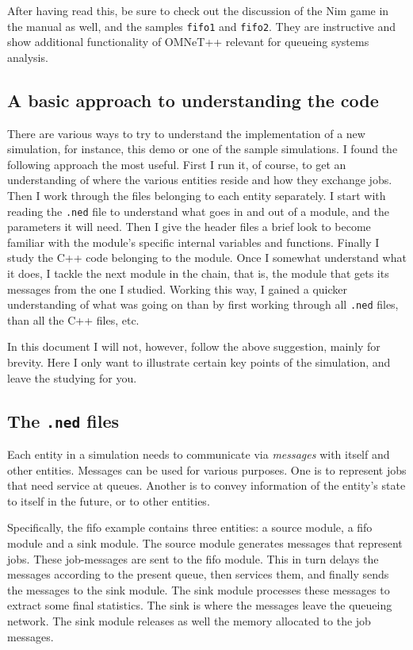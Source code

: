 \documentclass[a4paper]{article}
\begin{document}
After having read this, be sure to check out the discussion of the Nim
game in the manual as well, and the samples \texttt{fifo1} and
\texttt{fifo2}.  They are instructive and show additional
functionality of OMNeT++ relevant for queueing systems analysis.

\subsection{A basic  approach to understanding the code}
There are various ways to try to understand the implementation of a
new simulation, for instance, this demo or one of the sample
simulations. I found the following approach the most useful. First I
run it, of course, to get an understanding of where the various
entities reside and how they exchange jobs. Then I work through the
files belonging to  each
entity  separately. I start with reading the \texttt{.ned} file to
understand what goes in and out of a module, and the parameters it
will need.  Then I give the header files a brief look to become
familiar with the module's specific internal variables and functions.
Finally I study the C++ code belonging to the  module. Once I somewhat
understand what it  does, I tackle the next module in the
chain, that is, the module that gets its messages from the one  I
studied. Working this way, I gained a quicker understanding
of what was going on than by first working through all \texttt{.ned}
files, than all the C++ files, etc.

In this document I will not, however, follow the above suggestion,
mainly for brevity. Here I only want to illustrate certain key points
of the simulation, and leave the studying for you.

\subsection{The \texttt{.ned} files}
\label{sec:texttt.ned-files}
Each entity in a simulation needs to communicate via \emph{messages}
with itself and other entities. Messages can be used for various
purposes. One is to represent jobs that need service at queues.
Another is to convey information of the entity's state to itself in
the future, or to other entities.

Specifically, the fifo example contains three entities: a source module,
a fifo module and a sink module. The source module generates messages
that represent jobs.  These job-messages are sent to the fifo module.
This in turn delays the messages according to the present queue, then
services them, and finally sends the messages to the sink module. The
sink module processes these messages to extract some final statistics.
The sink is where the messages leave the queueing network.  The sink
module releases as well the memory allocated to the job messages.
\end{document}

